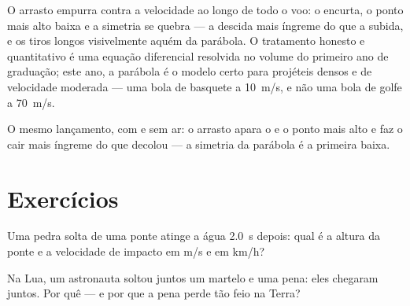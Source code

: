 \begin{remark}\label{rem:g12:projectile-motion:drag}
O arrasto empurra contra a velocidade ao longo de todo o voo: o  encurta, o
ponto mais alto baixa e a simetria se quebra --- a descida mais íngreme do que a
subida, e os tiros longos visivelmente aquém da parábola. O tratamento honesto e
quantitativo é uma equação diferencial resolvida no volume do primeiro ano de
graduação; este ano, a parábola é o modelo certo para projéteis densos e de velocidade
moderada --- uma bola de basquete a \qty{10}{m/s}, e não uma bola de golfe a
\qty{70}{m/s}.
\end{remark}

\begin{omfigure}

{\small O mesmo lançamento, com e sem ar: o arrasto apara o  e o ponto mais
alto e faz o  cair mais íngreme do que decolou --- a simetria da parábola é a
primeira baixa.}
\end{omfigure}

\section{Exercícios}

\begin{exercise}[$\star$]\label{exo:g12:projectile-motion:1}
Uma pedra solta de uma ponte atinge a água \qty{2.0}{s} depois: qual é a altura da
ponte e a velocidade de impacto em \unit{m/s} e em \unit{km/h}?
\end{exercise}

\begin{exercise}[$\star$]\label{exo:g12:projectile-motion:2}
Na Lua, um astronauta soltou juntos um martelo e uma pena: eles chegaram juntos. Por
quê --- e por que a pena perde tão feio na Terra?
\end{exercise}

